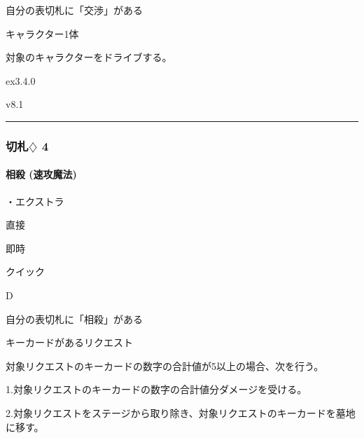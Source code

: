\documentclass[letterpaper,10pt,dvipdfmx]{sphinxmanual}
\begin{document}
\sphinxAtStartPar
自分の表切札に「交渉」がある

\sphinxAtStartPar
{}

\sphinxAtStartPar
キャラクター1体

\sphinxAtStartPar
{}

\sphinxAtStartPar
対象のキャラクターをドライブする。

\sphinxAtStartPar
{}  ex3.4.0

\sphinxAtStartPar
{}  v8.1


\bigskip\hrule\bigskip



\subsubsection{切札{\normalsize $\diamondsuit$} 4}
\label{\detokenize{auto/frameActionlist:id55}}

\paragraph{相殺 (速攻魔法)}
\label{\detokenize{auto/frameActionlist:act-reckoning}}\label{\detokenize{auto/frameActionlist:id56}}
\sphinxAtStartPar
{}

\sphinxAtStartPar
・エクストラ

\sphinxAtStartPar
{} 直接

\sphinxAtStartPar
{} 即時

\sphinxAtStartPar
{} クイック

\sphinxAtStartPar
{} D

\sphinxAtStartPar
{}

\sphinxAtStartPar
自分の表切札に「相殺」がある

\sphinxAtStartPar
{}

\sphinxAtStartPar
キーカードがあるリクエスト

\sphinxAtStartPar
{}

\sphinxAtStartPar
対象リクエストのキーカードの数字の合計値が5以上の場合、次を行う。

\sphinxAtStartPar
1.対象リクエストのキーカードの数字の合計値分ダメージを受ける。

\sphinxAtStartPar
2.対象リクエストをステージから取り除き、対象リクエストのキーカードを墓地に移す。
\end{document}
